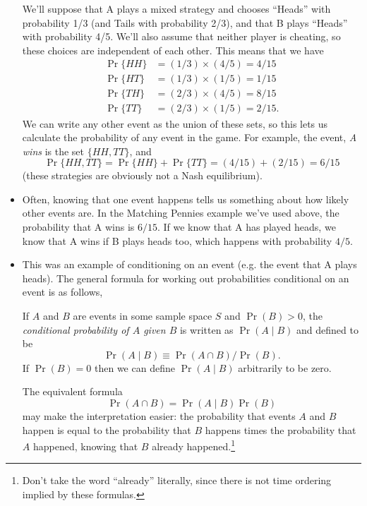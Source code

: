 \begin{itemize}[leftmargin=0pt]
\begin{ex}
    We'll suppose that A plays a mixed strategy and chooses ``Heads''
    with probability 1/3 (and Tails with probability 2/3), and that B
    plays ``Heads'' with probability 4/5.  We'll also assume that
    neither player is cheating, so these choices are independent of
    each other.  This means that we have
    \begin{align*}
      \Pr \{HH\} &= (1/3) \times (4/5) = 4/15 \\
      \Pr \{HT\} &= (1/3) \times (1/5) = 1/15 \\
      \Pr \{TH\} &= (2/3) \times (4/5) = 8/15 \\
      \Pr \{TT\} &= (2/3) \times (1/5) = 2/15.
    \end{align*}
    We can write any other event as the union of these sets, so this
    lets us calculate the probability of any event in the game.  For
    example, the event, \emph{A wins} is the set $\{HH,TT\}$, and
    \begin{equation*}
      \Pr \{HH, TT\} = \Pr \{HH\} + \Pr \{TT\} = (4/15) + (2/15) = 6/15
    \end{equation*}
    (these strategies are obviously not a Nash equilibrium).
  \end{ex}

\item Often, knowing that one event happens tells us something about
  how likely other events are.  In the Matching Pennies example we've
  used above, the probability that A wins is $6/15$.  If we know that
  A has played heads, we know that A wins if B plays heads too, which
  happens with probability $4/5$.

\item This was an example of conditioning on an event (e.g. the event
  that A plays heads).  The general formula for working out
  probabilities conditional on an event is as follows,

  \begin{defn}
    If $A$ and $B$ are events in some sample space $S$ and $\Pr(B)>0$,
    the \emph{conditional probability of $A$ given $B$} is written as
    $\Pr(A \mid B)$ and defined to be
    \begin{equation*}
      \Pr(A \mid B) \equiv \Pr(A \cap B) / \Pr(B).
    \end{equation*}
    If $\Pr(B) = 0$ then we can define $\Pr(A \mid B)$ arbitrarily to be
    zero.
  \end{defn}

  The equivalent formula
  \begin{equation*}
    \Pr(A \cap B) = \Pr(A \mid B) \Pr(B)
  \end{equation*}
  may make the interpretation easier: the probability that events $A$
  and $B$ happen is equal to the probability that $B$ happens times
  the probability that $A$ happened, knowing that $B$ already
  happened.\footnote{Don't take the word ``already'' literally, since
  there is not time ordering implied by these formulas.}


\end{itemize}
